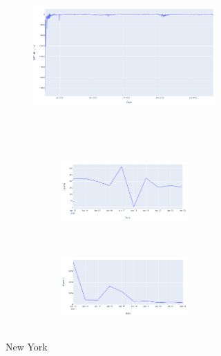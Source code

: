 \documentclass[11pt,twocolumn,letterpaper]{article}
\begin{document}
\begin{figure}
\centering
\begin{subfigure}{0.48\linewidth}
    \begin{subfigure}{0.48\linewidth}
        \centering
        \includegraphics[width=\linewidth, height=6.3cm]{images/ny_overview.PNG}
    \end{subfigure}
    \hfill
    \begin{subfigure}{0.48\linewidth}
        \begin{subfigure}{\linewidth}
            \centering
            \includegraphics[width=\linewidth, height=3.15cm]{images/ny_cdc.PNG}
            \vfill
        \end{subfigure}
        \begin{subfigure}{\linewidth}
            \centering
            \includegraphics[width=\linewidth, height=3.15cm]{images/ny_jhu.PNG}
            \vfill
        \end{subfigure}
    \end{subfigure}
    \caption{New York}
\end{subfigure}
\hfill
\begin{subfigure}{0.48\linewidth}
    \begin{subfigure}{0.48\linewidth}

\end{subfigure}
\end{subfigure}
\end{figure}
\end{document}
